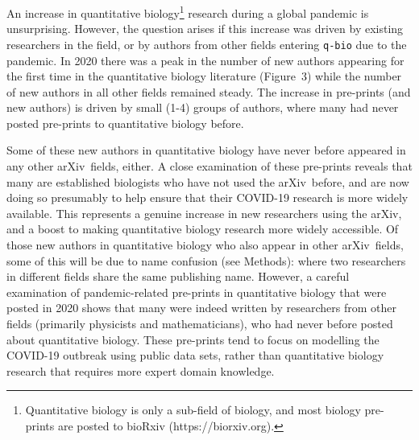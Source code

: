\documentclass[a4paper,12pt]{article}
\newcommand{\todo}[1]{\textcolor{red}{#1}}
\newcommand{\arxiv}{arXiv}
\renewcommand*{\thefootnote}{\arabic{footnote}}
\begin{document}
\renewcommand{\thefootnote}{$\dagger$} 
 
An increase in quantitative biology\footnote{Quantitative biology is only a sub-field of biology, and most biology pre-prints are posted to bioRxiv ({https://biorxiv.org}).} research during a global pandemic is unsurprising. 
However, the question arises if this increase was driven by existing researchers in the field, or by authors from other fields entering \texttt{q-bio} due to the pandemic.
In 2020 there was a peak in the number of new authors appearing for the first time in the quantitative biology literature (Figure~3) while the number of new authors in all other fields remained steady. %
The increase in pre-prints (and new authors) is driven by small (1-4) groups of authors, where many had never posted pre-prints to quantitative biology before.


Some of these new authors in quantitative biology have never before appeared in any other \arxiv\ fields, either.
A close examination of these pre-prints reveals that many are established biologists who have not used the \arxiv\ before, and are now doing so presumably to help ensure that their COVID-19 research is more widely available. This represents a genuine increase in new researchers using the \arxiv, and a boost to making quantitative biology research more widely accessible. Of those new authors in quantitative biology who also appear in other \arxiv\ fields, some of this will be due to name confusion (see Methods): where two researchers in different fields share the same publishing name. However, a careful examination of pandemic-related pre-prints in quantitative biology that were posted in 2020 shows that many were indeed written by researchers from other fields (primarily physicists and mathematicians), who had never before posted about quantitative biology. These pre-prints tend to focus on modelling the COVID-19 outbreak using public data sets, rather than quantitative biology research that requires more expert domain knowledge. 




\end{document}
